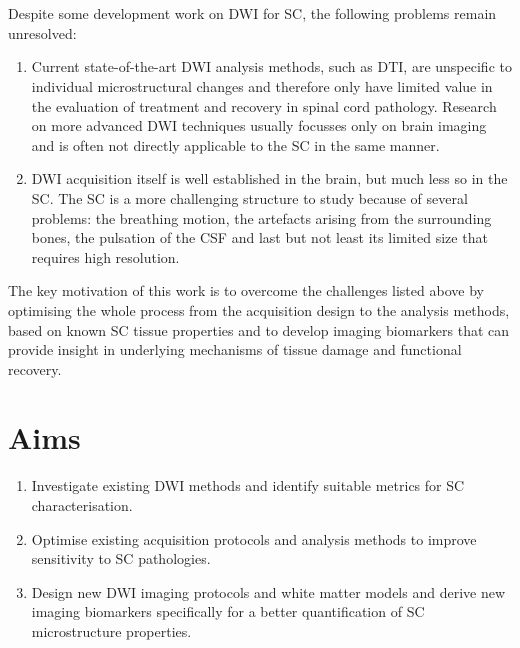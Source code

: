 

\section{}
Despite some development work on \gls{DWI} for \gls{SC}, the following problems remain unresolved:
\begin{enumerate}
\item Current state-of-the-art \gls{DWI} analysis methods, such as \gls{DTI}, are unspecific to individual microstructural changes and therefore only have limited value in the evaluation of treatment and recovery in spinal cord pathology. Research on more advanced \gls{DWI} techniques usually focusses only on brain imaging and is often not directly applicable to the \gls{SC} in the same manner.
\item \gls{DWI} acquisition itself is well established in the brain, but much less so in the \gls{SC}. The \gls{SC} is a more challenging structure to study because of several problems: the breathing motion, the artefacts arising from the surrounding bones, the pulsation of the {\gls{CSF}} and last but not least its limited size that requires high resolution.  
\end{enumerate} 
The key motivation of this work is to overcome the challenges listed above by optimising the whole process from the acquisition design to the analysis methods, based on known \gls{SC} tissue properties and to develop imaging biomarkers that can provide insight in underlying mechanisms of tissue damage and functional recovery.

\section{Aims}
\begin{enumerate}
  \item Investigate existing \gls{DWI} methods and identify suitable metrics for \gls{SC} characterisation.
  \item Optimise existing acquisition protocols and analysis methods to improve sensitivity to \gls{SC} pathologies.
  \item Design new \gls{DWI} imaging protocols and white matter models and derive new imaging biomarkers specifically for a better quantification of \gls{SC} microstructure properties.
\end{enumerate}

